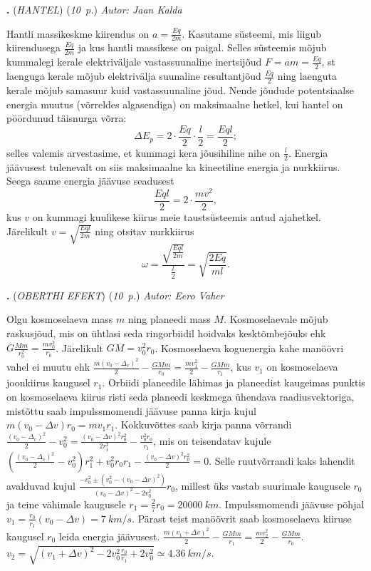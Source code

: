 \documentclass[11pt,a5paper]{article}
\newcommand{\numb}[1]{\vspace{5pt}\textbf{\large #1}}
\newcommand{\nimi}[1]{(\textsl{\small #1})}
\newcommand{\punktid}[1]{(\emph{#1~p.})}
\newcounter{ylesanne}
\newcommand{\yl}[1]{\addtocounter{ylesanne}{1}\numb{\theylesanne.} \nimi{#1} \newblock{}}
\newcommand{\autor}[1]{\emph{ Autor: #1}}%
\begin{document}
\yl{HANTEL}
\punktid{10} \autor{Jaan Kalda}

Hantli massikeskme kiirendus on $a=\frac{Eq}{2m}$. Kasutame süsteemi, mis liigub kiirendusega $\frac{Eq}{2m}$ ja kus hantli massikese on paigal. Selles süsteemis mõjub kummalegi kerale elektriväljale vastassuunaline inertsijõud $F=am=\frac{Eq}{2}$, st laenguga kerale mõjub elektrivälja suunaline resultantjõud $\frac{Eq}{2}$ ning laenguta kerale mõjub samasuur kuid vastassuunaline jõud. Nende jõudude potentsiaalse energia muutus (võrreldes algasendiga) on maksimaalne hetkel, kui hantel on pöördunud täisnurga võrra: $$\Delta E_p=2\cdot \frac{Eq}2\cdot\frac l2=\frac{Eql}2;$$ selles valemis arvestasime, et kummagi kera jõusihiline nihe on $\frac l 2$. Energia jäävusest tulenevalt on siis maksimaalne ka kineetiline energia ja nurkkiirus.  Seega saame energia jäävuse seadusest $$\frac{Eql}2=2\cdot \frac{mv^2}2,$$ kus $v$ on kummagi kuulikese kiirus meie taustsüsteemis antud ajahetkel. Järelikult $v=\sqrt{\frac{Eql}{2m}}$ ning otsitav nurkkiirus $$\omega=\frac{\sqrt{\frac{Eql}{2m}}}{\frac{l}{2}}=\sqrt{\frac{2Eq}{ml}}.$$

\yl{OBERTHI EFEKT}
\punktid{10} \autor{Eero Vaher}

Olgu kosmoselaeva mass $m$ ning planeedi mass $M$. Kosmoselaevale mõjub raskusjõud, mis on ühtlasi seda ringorbiidil hoidvaks kesktõmbejõuks ehk $G\frac{Mm}{r_0^2}= \frac{mv_0^2}{r_0}$. Järelikult $GM=v_0^2r_0$. Kosmoselaeva koguenergia kahe manöövri vahel ei muutu ehk $\frac{m(v_0-\Delta_v)^2}{2}-\frac{GMm}{r_0}=\frac{mv_1^2}{2}-\frac{GMm}{r_1}$, kus $v_1$ on kosmoselaeva joonkiirus kaugusel $r_1$. Orbiidi planeedile lähimas ja planeedist kaugeimas punktis on kosmoselaeva kiirus risti seda planeedi keskmega ühendava raadiusvektoriga, mistõttu saab impulssmomendi jäävuse panna kirja kujul $m(v_0-\Delta v)r_0=mv_1r_1$. Kokkuvõttes saab kirja panna võrrandi $\frac{(v_0-\Delta_v)^2}{2}-v_0^2=\frac{(v_0-\Delta v)^2r_0^2}{2r_1^2}-\frac{v_0^2r_0}{r_1}$, mis on teisendatav kujule $\left(\frac{(v_0-\Delta_v)^2}{2}-v_0^2\right)r_1^2+v_0^2r_0r_1-\frac{(v_0-\Delta v)^2r_0^2}{2}=0$. Selle ruutvõrrandi kaks lahendit avalduvad kujul $\frac{-v_0^2\pm\left(v_0^2-\left(v_0-\Delta v\right)^2\right)}{\left(v_0-\Delta v\right)^2-2v_0^2}r_0$, millest üks vastab suurimale kaugusele $r_0$ ja teine vähimale kaugusele $r_1=\frac{2}{7}r_0=\SI{20000}{km}$. Impulssmomendi jäävuse põhjal $v_1=\frac{r_0}{r_1}\left(v_0-\Delta v\right)=\SI{7}{km\per s}$. Pärast teist manöövrit saab kosmoselaeva kiiruse kaugusel $r_0$ leida energia jäävusest. $\frac{m(v_1+\Delta v)^2}{2}-\frac{GMm}{r_1}=\frac{mv_2^2}{2}-\frac{GMm}{r_0}$. $v_2=\sqrt{\left(v_1+\Delta v\right)^2-2v_0^2\frac{r_0}{r_1}+2v_0^2}\simeq\SI{4.36}{km\per s}$.
\end{document}
